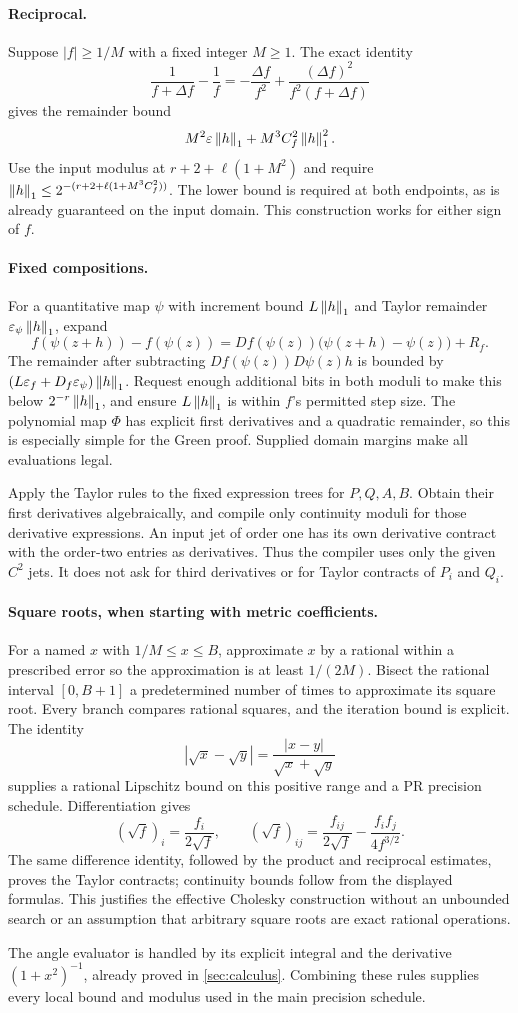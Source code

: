 \paragraph{Reciprocal.}
Suppose $|f|\ge1/M$ with a fixed integer $M\ge1$. The exact identity
\[
\frac1{f+\Delta f}-\frac1f
=-\frac{\Delta f}{f^2}
+\frac{(\Delta f)^2}{f^2(f+\Delta f)}
\]
gives the remainder bound
\begin{equation}\label{eq:reciprocalTaylor}
M^2\varepsilon\left\|h\right\|_1+M^3C_f^2\left\|h\right\|_1^2.
\end{equation}
Use the input modulus at $r+2+\ell(1+M^2)$ and require
$\left\|h\right\|_1\le2^{-(r+2+\ell(1+M^3C_f^2))}$.
The lower bound is required at both endpoints, as is already guaranteed on the input domain. This construction works for either sign of $f$.

\paragraph{Fixed compositions.}
For a quantitative map $\psi$ with increment bound $L\left\|h\right\|_1$ and Taylor remainder $\varepsilon_\psi\left\|h\right\|_1$, expand
\[
f(\psi(z+h))-f(\psi(z))
=Df(\psi(z))\bigl(\psi(z+h)-\psi(z)\bigr)+R_f.
\]
The remainder after subtracting $Df(\psi(z))D\psi(z)h$ is bounded by
$(L\varepsilon_f+D_f\varepsilon_\psi)\left\|h\right\|_1$.
Request enough additional bits in both moduli to make this below $2^{-r}\left\|h\right\|_1$, and ensure $L\left\|h\right\|_1$ is within $f$'s permitted step size. The polynomial map $\Phi$ has explicit first derivatives and a quadratic remainder, so this is especially simple for the Green proof. Supplied domain margins make all evaluations legal.

Apply the Taylor rules to the fixed expression trees for $P,Q,A,B$. Obtain their first derivatives algebraically, and compile only continuity moduli for those derivative expressions. An input jet of order one has its own derivative contract with the order-two entries as derivatives. Thus the compiler uses only the given $C^2$ jets. It does not ask for third derivatives or for Taylor contracts of $P_i$ and $Q_i$.

\paragraph{Square roots, when starting with metric coefficients.}
For a named $x$ with $1/M\le x\le B$, approximate $x$ by a rational within a prescribed error so the approximation is at least $1/(2M)$. Bisect the rational interval $[0,B+1]$ a predetermined number of times to approximate its square root. Every branch compares rational squares, and the iteration bound is explicit. The identity
\[
|\sqrt x-\sqrt y|=\frac{|x-y|}{\sqrt x+\sqrt y}
\]
supplies a rational Lipschitz bound on this positive range and a PR precision schedule. Differentiation gives
\[
(\sqrt f)_i=\frac{f_i}{2\sqrt f},\qquad
(\sqrt f)_{ij}=\frac{f_{ij}}{2\sqrt f}
-\frac{f_if_j}{4f^{3/2}}.
\]
The same difference identity, followed by the product and reciprocal estimates, proves the Taylor contracts; continuity bounds follow from the displayed formulas. This justifies the effective Cholesky construction without an unbounded search or an assumption that arbitrary square roots are exact rational operations.

The angle evaluator is handled by its explicit integral and the derivative
$(1+x^2)^{-1}$, already proved in \cref{sec:calculus}. Combining these rules supplies every local bound and modulus used in the main precision schedule.
